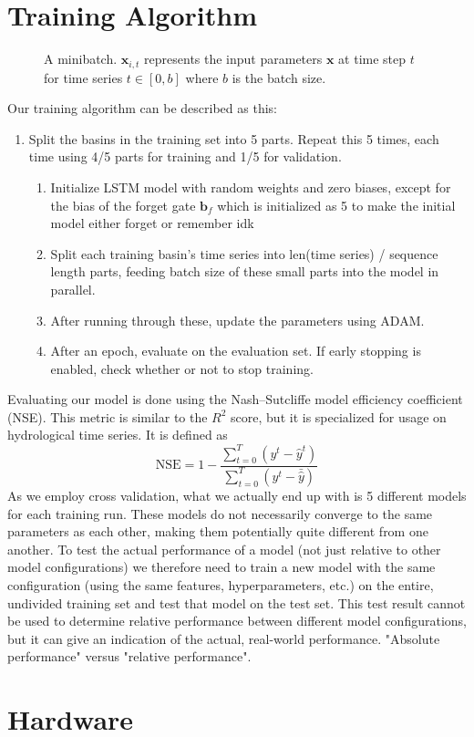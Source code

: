 \section{Training Algorithm}
\begin{figure}
\centering

\caption{A minibatch. $\bm{x}_{i,t}$ represents the input parameters $\bm{x}$ at time step $t$ for time series $t \in [0, b]$ where $b$ is the batch size.}
\label{minibatch}
\end{figure}
Our training algorithm can be described as this:
\begin{enumerate}
    \item Split the basins in the training set into 5 parts. Repeat this 5 times, each time using 4/5 parts for training and 1/5 for validation.\begin{enumerate}
        \item Initialize LSTM model with random weights and zero biases, except for the bias of the forget gate $\bm{b}_f$ which is initialized as 5 to make the initial model either forget or remember idk \citationneeded
        \item Split each training basin's time series into len(time series) / sequence length parts, feeding batch size of these small parts into the model in parallel. 
        \item After running through these, update the parameters using ADAM.
        \item After an epoch, evaluate on the evaluation set. If early stopping is enabled, check whether or not to stop training.
    \end{enumerate}
\end{enumerate}
Evaluating our model is done using the Nash–Sutcliffe model efficiency coefficient (NSE). \cite{NSE}
This metric is similar to the $R^2$ score, but it is specialized for usage 
on hydrological time series.
It is defined as 
\begin{equation}
    \text{NSE} = 1 - \frac{\sum_{t=0}^T\left( y^t - \hat{y}^t\right)}{\sum_{t=0}^T\left(y^t - \bar{\hat{y}}\right)} \label{NSE}
\end{equation}
As we employ cross validation, what we actually end up with is 5 different models 
for each training run. These models do not necessarily converge to the same parameters 
as each other, making them potentially quite different from one another. To test the 
actual performance of a model (not just relative to other model configurations) we 
therefore need to train a new model with the same configuration (using the same features, 
hyperparameters, etc.) on the entire, undivided training set and test that model 
on the test set. This test result cannot be used to determine relative performance 
between different model configurations, but it can give an indication of the actual, 
real-world performance. "Absolute performance" versus "relative performance".

\section{Hardware}
